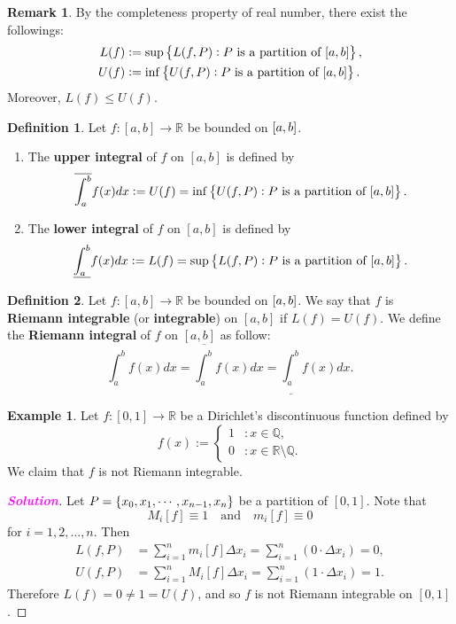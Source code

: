 \documentclass[12pt,openany]{book}
\theoremstyle{definition}
\newtheorem{definition}{Definition}[chapter]
\newtheorem{remark}{Remark}[chapter]
\newtheorem{example}{Example}[chapter]
\newcommand{\Q}{\mathbb{Q}}
\newcommand{\R}{\mathbb{R}}
\newcommand{\sol}{\textcolor{magenta}{\bf Solution}}
\newcommand{\upRiemannint}[2]{
	\overline{\int_{#1}^{#2}}
}
\newcommand{\loRiemannint}[2]{
	\underline{\int_{#1}^{#2}}
}
\begin{document}
	\newpage
	\begin{remark}
		By the completeness property of real number, there exist the followings:
		\begin{align*}
			L(f)&:=\sup\set{L(f,P):\text{$P$ is a partition of $[a,b]$}},\\
			U(f)&:=\inf\set{U(f,P):\text{$P$ is a partition of $[a,b]$}}.
		\end{align*} Moreover, \(L(f)\leq U(f)\).
	\end{remark}

	\begin{tcolorbox}[colframe=defcolor, title={\color{white}\bf Upper and Lower Integral}]
		\begin{definition}
			Let \(f:[a,b]\to\R\) be bounded on \(\sbr{a,b}\).
			\begin{enumerate}[(1)]
				\item The \textbf{upper integral} of \(f\) on \([a,b]\) is defined by \[
				\upRiemannint{a}{b}f(x)dx:=U(f)=\inf\set{U(f,P):\text{$P$ is a partition of $[a,b]$}}.
				\]
				\item The \textbf{lower integral} of \(f\) on \([a,b]\) is defined by \[
				\loRiemannint{a}{b}f(x)dx:=L(f)=\sup\set{L(f,P):\text{$P$ is a partition of $[a,b]$}}.
				\]
			\end{enumerate}
		\end{definition}
	\end{tcolorbox}
	\vspace{8pt}
	\begin{tcolorbox}[colframe=defcolor, title={\color{white}\bf Riemann Integral}]
		\begin{definition}
			Let \(f:[a,b]\to\R\) be bounded on \(\sbr{a,b}\).
			We say that \(f\) is \textbf{Riemann integrable} (or \textbf{integrable}) on \([a,b]\) if \(L(f)=U(f)\). We define the \textbf{Riemann integral} of \(f\) on \([a,b]\) as follow: \[
			\int_a^b f(x)dx =\upRiemannint{a}{b}f(x)dx=\loRiemannint{a}{b}f(x)dx.
			\]
		\end{definition}
	\end{tcolorbox}
	\begin{example}
		Let \(f:[0,1]\to\R\) be a Dirichlet's discontinuous function defined by \[
		f(x):=\begin{cases}
			1 &: x\in\Q,\\
			0 &: x\in\R\setminus\Q.
		\end{cases}
		\] We claim that \(f\) is not Riemann integrable.
		\begin{proof}[\sol]
			Let \(P=\set{x_0,x_1,\cdots,x_{n-1},x_n}\) be a partition of \([0,1]\). Note that \[
			M_i[f]\equiv 1\quad\text{and}\quad m_i[f]\equiv 0
			\] for \(i=1,2,\dots, n\). Then \begin{align*}
				L(f,P)&=\sum_{i=1}^n m_i[f]\Delta x_i=\sum_{i=1}^n(0\cdot\Delta x_i)=0,\\
				U(f,P)&=\sum_{i=1}^n M_i[f]\Delta x_i=\sum_{i=1}^n(1\cdot\Delta x_i)=1.
			\end{align*} Therefore \(L(f)=0\neq 1=U(f)\), and so \(f\) is not Riemann integrable on \([0,1]\).
		\end{proof}
	\end{example}
	
\end{document}
